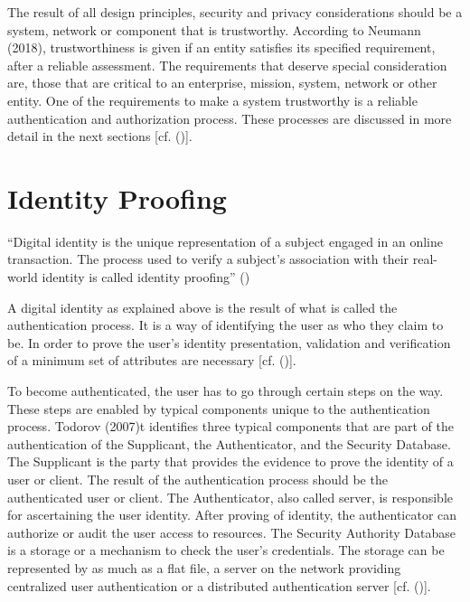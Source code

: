 The result of all design principles, security and privacy considerations should be a system, network or component that is trustworthy. According to Neumann (2018), trustworthiness is given if an entity satisfies its specified requirement, after a reliable assessment. The requirements that deserve special consideration are, those that are critical to an enterprise, mission, system, network or other entity. One of the requirements to make a system trustworthy is a reliable authentication and authorization process. These processes are discussed in more detail in the next sections [cf. (\cite{Neumann:2018:PTC})].



\section{Identity Proofing}
\label{identityProofing}

“Digital identity is the unique representation of a subject engaged in an online transaction. The process used to verify a subject’s association with their real-world identity is called identity proofing” (\cite{NIST:2017:DIG})

A digital identity as explained above is the result of what is called the authentication process. It is a way of identifying the user as who they claim to be. In order to prove the user's identity presentation, validation and verification of a minimum set of attributes are necessary [cf. (\cite{Boyd:2012:GSOAuth})]. 

To become authenticated, the user has to go through certain steps on the way. These steps are enabled by typical components unique to the authentication process. Todorov (2007)t identifies three typical components that are part of the authentication of the Supplicant, the Authenticator, and the Security Database. The Supplicant is the party that provides the evidence to prove the identity of a user or client. The result of the authentication process should be the authenticated user or client. The Authenticator, also called server, is responsible for ascertaining the user identity. After proving of identity, the authenticator can authorize or audit the user access to resources. The Security Authority Database is a storage or a mechanism to check the user's credentials. The storage can be represented by as much as a flat file, a server on the network providing centralized user authentication or a distributed authentication server [cf. (\cite{Todorov:2007:MUI})]. 



